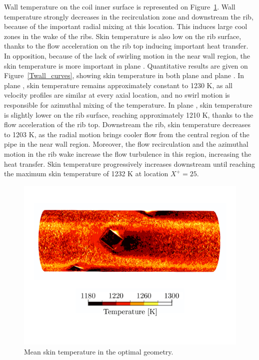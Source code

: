 Wall temperature on the coil inner surface is represented on Figure~\ref{Twall}. Wall temperature strongly decreases in the recirculation zone and downstream the rib, because of the important radial mixing at this location. This induces large cool zones in the wake of the ribs. Skin temperature is also low on the rib surface, thanks to the flow acceleration on the rib top inducing important heat transfer. In opposition, because of the lack of swirling motion in the near wall region, the skin temperature is more important in plane . Quantitative results are given on Figure~\ref{Twall_curves}, showing skin temperature in both plane  and plane . In plane , skin temperature remains approximately constant to 1230 K, as all velocity profiles are similar at every axial location, and no swirl motion is responsible for azimuthal mixing of the temperature. In plane , skin temperature is slightly lower on the rib surface, reaching approximately 1210 K, thanks to the flow acceleration of the rib top. Downstream the rib, skin temperature decreases to 1203 K, as the radial motion brings cooler flow from the central region of the pipe in the near wall region. Moreover, the flow recirculation and the azimuthal motion in the rib wake increase the flow turbulence in this region, increasing the heat transfer. Skin temperature progressively increases downstream until reaching the maximum skin temperature of 1232 K at location $X^+=25$.\\

\begin{figure}[h]
\centering
\includegraphics[width=\linewidth]{fig/applications/optim/Twall.pdf}
\caption{Mean skin temperature in the optimal geometry.}
\label{Twall}
\end{figure}

